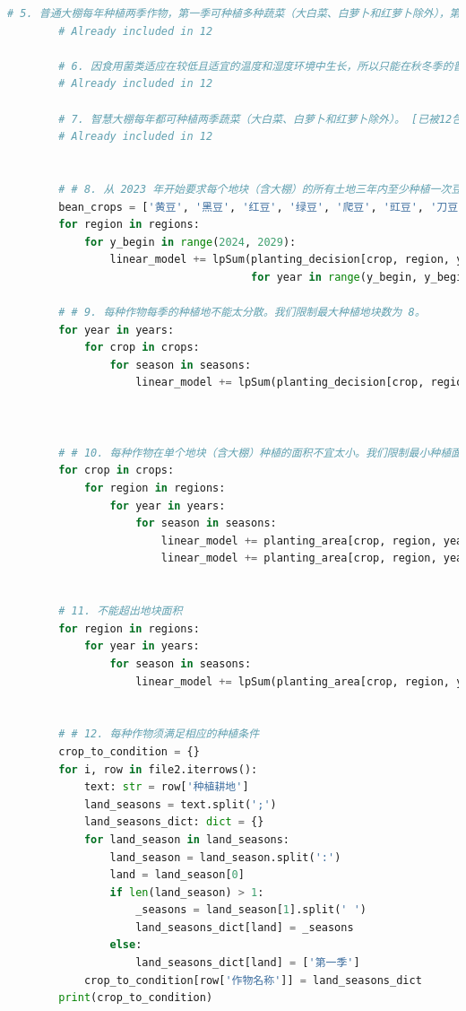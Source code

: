 \documentclass{cumcmthesis}
\begin{document}
\begin{appendices}
\begin{lstlisting}[language=python]
        # 5. 普通大棚每年种植两季作物，第一季可种植多种蔬菜（大白菜、白萝卜和红萝卜除外），第二季只能种植食用菌。[已被12包含]
        # Already included in 12
    
        # 6. 因食用菌类适应在较低且适宜的温度和湿度环境中生长，所以只能在秋冬季的普通大棚里种植。 [已被12包含]
        # Already included in 12
    
        # 7. 智慧大棚每年都可种植两季蔬菜（大白菜、白萝卜和红萝卜除外）。 [已被12包含]
        # Already included in 12
    
    
        # # 8. 从 2023 年开始要求每个地块（含大棚）的所有土地三年内至少种植一次豆类作物。
        bean_crops = ['黄豆', '黑豆', '红豆', '绿豆', '爬豆', '豇豆', '刀豆', '芸豆']
        for region in regions:
            for y_begin in range(2024, 2029):
                linear_model += lpSum(planting_decision[crop, region, year, season] for crop in bean_crops 
                                      for year in range(y_begin, y_begin + 3) for season in seasons) >= 1
    
        # # 9. 每种作物每季的种植地不能太分散。我们限制最大种植地块数为 8。
        for year in years:
            for crop in crops:
                for season in seasons:
                    linear_model += lpSum(planting_decision[crop, region, year, season] for region in regions) <= 8
    
    
    
        # # 10. 每种作物在单个地块（含大棚）种植的面积不宜太小。我们限制最小种植面积为 30%。
        for crop in crops:
            for region in regions:
                for year in years:
                    for season in seasons:
                        linear_model += planting_area[crop, region, year, season] >= 0.3 * region_areas[region] * planting_decision[crop, region, year, season]
                        linear_model += planting_area[crop, region, year, season] <= region_areas[region] * planting_decision[crop, region, year, season]
    
    
        # 11. 不能超出地块面积
        for region in regions:
            for year in years:
                for season in seasons:
                    linear_model += lpSum(planting_area[crop, region, year, season] for crop in crops) <= region_areas[region]
    
    
        # # 12. 每种作物须满足相应的种植条件
        crop_to_condition = {}
        for i, row in file2.iterrows():
            text: str = row['种植耕地']
            land_seasons = text.split(';')
            land_seasons_dict: dict = {}
            for land_season in land_seasons:
                land_season = land_season.split(':')
                land = land_season[0]
                if len(land_season) > 1:
                    _seasons = land_season[1].split(' ')
                    land_seasons_dict[land] = _seasons
                else:
                    land_seasons_dict[land] = ['第一季']
            crop_to_condition[row['作物名称']] = land_seasons_dict
        print(crop_to_condition)
    

\end{lstlisting}
\end{appendices}
\end{document}
